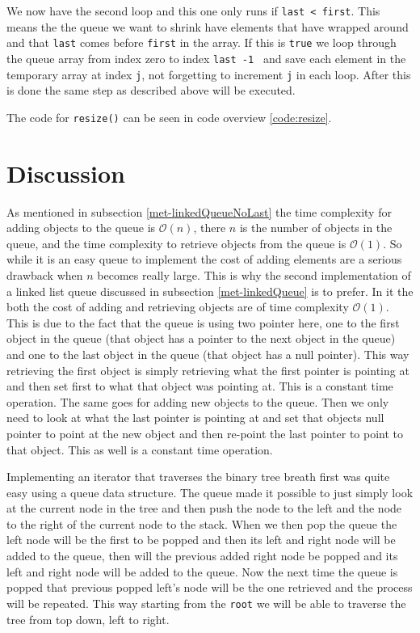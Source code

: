 \documentclass[a4paper,11pt]{article}
\begin{document}
We now have the second loop and this one only runs if {\tt last < first}. This means the the queue we want to shrink
have elements that have wrapped around and that {\tt last} comes before {\tt first} in the array. If this is {\tt true}
we loop through the queue array from index zero to index {\tt last -1 } and save each element in the temporary array at
index {\tt j}, not forgetting to increment {\tt j} in each loop. After this is done the same step as described above will
be executed.

The code for {\tt resize()} can be seen in code overview \ref{code:resize}.

\section{Discussion}
As mentioned in subsection \ref{met-linkedQueueNoLast} the time complexity for adding objects to the queue is $\mathcal{O}(n)$,
there $n$ is the number of objects in the queue, and the time complexity to retrieve objects from the queue is $\mathcal{O}(1)$.
So while it is an easy queue to implement the cost of adding elements are a serious drawback when $n$ becomes really large.
This is why the second implementation of a linked list queue discussed in subsection \ref{met-linkedQueue} is to prefer.
In it the both the cost of adding and retrieving objects are of time complexity $\mathcal{O}(1)$. This is due to the fact
that the queue is using two pointer here, one to the first object in the queue (that object has a pointer to the next
object in the queue) and one to the last object in the queue (that object has a null pointer). This way retrieving the
first object is simply retrieving what the first pointer is pointing at and then set first to what that object was pointing
at. This is a constant time operation. The same goes for adding new objects to the queue. Then we only need to look at what
the last pointer is pointing at and set that objects null pointer to point at the new object and then re-point the last
pointer to point to that object. This as well is a constant time operation.

Implementing an iterator that traverses the binary tree breath first was quite easy using a queue data structure. The queue
made it possible to just simply look at the current node in the tree and then push the node to the left and the node to
the right of the current node to the stack. When we then pop the queue the left node will be the first to be popped and then its
left and right node will be added to the queue, then will the previous added right node be popped and its left and right
node will be added to the queue. Now the next time the queue is popped that previous popped left's node will be the one
retrieved and the process will be repeated. This way starting from the {\tt root} we will be able to traverse the tree from top down,
left to right.
\end{document}
